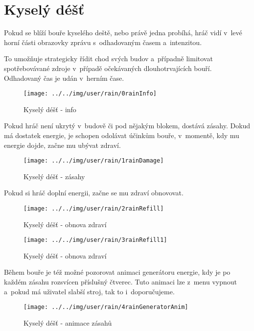 
\section{Kyselý déšť}

Pokud se blíží bouře kyselého deště, nebo právě jedna probíhá, hráč vidí v~levé horní části obrazovky zprávu s~odhadovaným časem a~intenzitou.

To umožňuje strategicky řídit chod svých budov a~případně limitovat spotřebovávané zdroje v~případě očekávaných dlouhotrvajících bouří. Odhadovaný čas je udán v~herním čase.

\begin{figure}[!ht]\centering
\texttt{[image: ../../img/user/rain/0rainInfo]}

\caption{Kyselý déšť - info}
\label{fig:user_rain_0rainInfo}

\end{figure}

\FloatBarrier

Pokud hráč není ukrytý v~budově či pod nějakým blokem, dostává zásahy. Dokud má dostatek energie, je schopen odolávat účinkům bouře, v~momentě, kdy mu energie dojde, začne mu ubývat zdraví.


\begin{figure}[!ht]\centering
\texttt{[image: ../../img/user/rain/1rainDamage]}

\caption{Kyselý déšť - zásahy}
\label{fig:user_rain_1rainDamage}

\end{figure}

\FloatBarrier

Pokud si hráč doplní energii, začne se mu zdraví obnovovat.

\begin{figure}[!ht]\centering
\texttt{[image: ../../img/user/rain/2rainRefill]}

\caption{Kyselý déšť - obnova zdraví}
\label{fig:user_rain_2rainRefill}

\end{figure}


\begin{figure}[!ht]\centering
\texttt{[image: ../../img/user/rain/3rainRefill1]}

\caption{Kyselý déšť - obnova zdraví}
\label{fig:user_rain_3rainRefill1}

\end{figure}

\FloatBarrier

Během bouře je též možné pozorovat animaci generátoru energie, kdy je po každém zásahu rozsvícen příslušný čtverec. Tuto animaci lze z~menu vypnout a~pokud má uživatel slabší stroj, tak to i~doporučujeme.

\begin{figure}[!ht]\centering
\texttt{[image: ../../img/user/rain/4rainGeneratorAnim]}

\caption{Kyselý déšť - animace zásahů}
\label{fig:user_rain_4rainGeneratorAnim}

\end{figure}


\FloatBarrier
